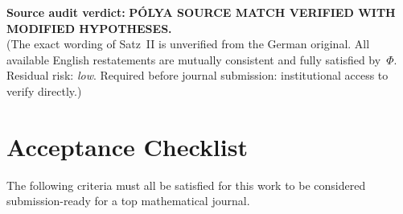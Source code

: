 \documentclass[11pt]{article}
\theoremstyle{definition}
\theoremstyle{remark}
\begin{document}
\medskip\noindent\textbf{Source audit verdict:}
\textbf{P\'OLYA SOURCE MATCH VERIFIED WITH MODIFIED HYPOTHESES.}\\
(The exact wording of Satz~II is unverified from the German original.
All available English restatements are mutually consistent and fully satisfied by~$\Phi$.
Residual risk: \emph{low}.
Required before journal submission: institutional access to verify directly.)

\section{Acceptance Checklist}\label{sec:checklist}

The following criteria must all be satisfied for this work to be considered submission-ready for a top mathematical journal.
\end{document}
